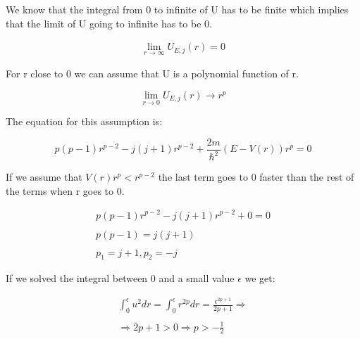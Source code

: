We know that the integral from 0 to infinite of U has to be finite which implies that the limit of U going to infinite has to be 0.

\begin{equation}
  \begin{array}{c}
    \lim_{r\to\infty} U_{E,j}(r) = 0
  \end{array}
\end{equation}

For r close to 0 we can assume that U is a polynomial function of r.

\begin{equation}
  \lim_{r\to 0} U_{E,j}(r) \to r^p
\end{equation}

The equation for this assumption is:

\begin{equation}
  p(p-1)r^{p-2} - j(j+1) r^{p-2} + \frac{2m}{\hbar^2}(E-V(r))r^p = 0
\end{equation}

If we assume that $V(r)r^p < r^{p-2}$ the last term goes to 0 faster than the rest of the terms when r goes to 0. 



\begin{equation}
  \begin{array}{c}
    p(p-1)r^{p-2} - j(j+1)r^{p-2} + 0 = 0
    \\

    \\
    p(p-1) = j(j+1)
    \\

    \\
    p_1 = j+1, p_2 = -j
  \end{array}
\end{equation}

If we solved the integral between 0 and a small value $\epsilon$ we get:

\begin{equation}
  \begin{array}{c}
    \int_{0}^{\epsilon} u^2 dr = \int_{0}^{\epsilon} r^{2p} dr = \frac{\epsilon^{2p+1}}{2p+1} \Rightarrow
    \\

    \\ \Rightarrow 2p+1 > 0 \Rightarrow p > -\frac{1}{2}
  \end{array}
\end{equation}


